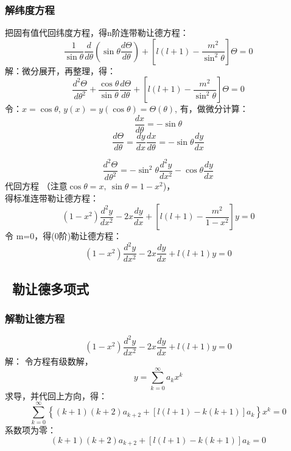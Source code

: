 \begin{frame}
	\frametitle{解纬度方程}
	把固有值代回纬度方程，得n阶连带勒让德方程：
	\begin{equation*}
		\frac{1}{\sin \theta} \frac{d}{d \theta}\left(\sin \theta \frac{d \Theta}{d \theta}\right)+\left[l(l+1)-\frac{m^{2}}{\sin ^{2} \theta}\right] \Theta=0
	\end{equation*}	
	\alert{解：}微分展开，再整理，得：
	\begin{equation*}
		\frac{d^{2} \Theta}{d \theta^{2}}+\frac{\cos \theta}{\sin \theta} \frac{d \Theta}{d \theta}+\left[l(l+1)-\frac{m^{2}}{\sin ^{2} \theta}\right] \Theta=0
	\end{equation*}		
	令：$x=\cos \theta$,  $y(x)= y(\cos \theta) =\Theta (\theta)$, 有，做微分计算：
	\begin{equation*}
		\frac{d x}{d  \theta} =-\sin \theta  
	\end{equation*}		
	\begin{equation*}
		\frac{d \Theta}{d \theta} =\frac{d y}{d x}\frac{d x}{d \theta} =-\sin \theta \frac{d y}{d x}
	\end{equation*}		
\end{frame}	

\begin{frame}
	\begin{equation*}
		\frac{ d^2 \Theta }{d \theta ^2} =-\sin ^2 \theta \frac{d^2 y}{d x^2} -\cos \theta \frac{d y}{d x}
	\end{equation*}		
	代回方程 （注意$\cos\theta =x,~ \sin  \theta =1-x^2 $)， \\
	得标准连带勒让德方程：
	\begin{equation*}
		\left(1-x^{2}\right) \frac{d^{2} y}{d x^{2}}-2 x \frac{d y}{d x}+\left[l(l+1)-\frac{m^{2}}{1-x^{2}}\right] y=0
	\end{equation*}		
	令 m=0，得(0阶)勒让德方程：
	\begin{equation*}
		\left(1-x^{2}\right) \frac{d^{2} y}{d x^{2}}-2 x \frac{d y}{d x}+l(l+1)y=0
	\end{equation*}		
\end{frame}	

\subsection{ 勒让德多项式}

\begin{frame}
	\frametitle{解勒让德方程}
	\begin{equation*}
		\left(1-x^{2}\right) \frac{d^{2} y}{d x^{2}}-2 x \frac{d y}{d x}+l(l+1)y=0
	\end{equation*}		
	\alert{解：} 令方程有级数解，
	\[ y=\sum_{k=0}^{\infty} a_k x ^k \]
	求导，并代回上方向，得：
	\begin{equation*}
		\sum_{k=0}^{\infty}\left\{(k+1)(k+2) a_{k+2}+[l(l+1)-k(k+1)] a_{k}\right\} x^{k}=0
	\end{equation*}	
	系数项为零：
	\begin{equation*}
		(k+1)(k+2) a_{k+2}+[l(l+1)-k(k+1)] a_{k}=0
	\end{equation*}	   
\end{frame}	

